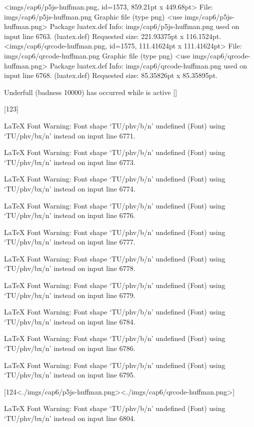 <imgs/cap6/p5js-huffman.png, id=1573, 859.21pt x 449.68pt>
File: imgs/cap6/p5js-huffman.png Graphic file (type png)
<use imgs/cap6/p5js-huffman.png>
Package luatex.def Info: imgs/cap6/p5js-huffman.png  used on input line 6763.
(luatex.def)             Requested size: 221.93375pt x 116.1524pt.
<imgs/cap6/qrcode-huffman.png, id=1575, 111.41624pt x 111.41624pt>
File: imgs/cap6/qrcode-huffman.png Graphic file (type png)
<use imgs/cap6/qrcode-huffman.png>
Package luatex.def Info: imgs/cap6/qrcode-huffman.png  used on input line 6768.
(luatex.def)             Requested size: 85.35826pt x 85.35895pt.

Underfull \vbox (badness 10000) has occurred while \output is active []

[123]

LaTeX Font Warning: Font shape `TU/phv/b/n' undefined
(Font)              using `TU/phv/bx/n' instead on input line 6771.


LaTeX Font Warning: Font shape `TU/phv/b/n' undefined
(Font)              using `TU/phv/bx/n' instead on input line 6773.


LaTeX Font Warning: Font shape `TU/phv/b/n' undefined
(Font)              using `TU/phv/bx/n' instead on input line 6774.


LaTeX Font Warning: Font shape `TU/phv/b/n' undefined
(Font)              using `TU/phv/bx/n' instead on input line 6776.


LaTeX Font Warning: Font shape `TU/phv/b/n' undefined
(Font)              using `TU/phv/bx/n' instead on input line 6777.


LaTeX Font Warning: Font shape `TU/phv/b/n' undefined
(Font)              using `TU/phv/bx/n' instead on input line 6778.


LaTeX Font Warning: Font shape `TU/phv/b/n' undefined
(Font)              using `TU/phv/bx/n' instead on input line 6779.


LaTeX Font Warning: Font shape `TU/phv/b/n' undefined
(Font)              using `TU/phv/bx/n' instead on input line 6784.


LaTeX Font Warning: Font shape `TU/phv/b/n' undefined
(Font)              using `TU/phv/bx/n' instead on input line 6786.


LaTeX Font Warning: Font shape `TU/phv/b/n' undefined
(Font)              using `TU/phv/bx/n' instead on input line 6795.

[124<./imgs/cap6/p5js-huffman.png><./imgs/cap6/qrcode-huffman.png>]

LaTeX Font Warning: Font shape `TU/phv/b/n' undefined
(Font)              using `TU/phv/bx/n' instead on input line 6804.



